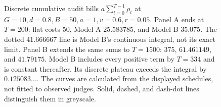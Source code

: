 \begin{figure}[htbp]
\caption{Discrete cumulative audit bills $a\sum_{t=0}^{T-1}\rho_t$ at $G=10,d=0.8,B=50,a=1,v=0.6,r=0.05$. Panel A ends at $T=200$: flat costs $50$, Model A $25.583785$, and Model B $35.075$. The dotted $41.666667$ line is Model B's continuous integral, not its exact limit. Panel B extends the same sums to $T=1500$: $375$, $61.461149$, and $41.79175$. Model B includes every positive term by $T=334$ and is constant thereafter. Its discrete plateau exceeds the integral by $0.125083\ldots$. The curves are calculated from the displayed schedules, not fitted to observed judges. Solid, dashed, and dash-dot lines distinguish them in greyscale.}
\label{fig:amort}
\end{figure}
